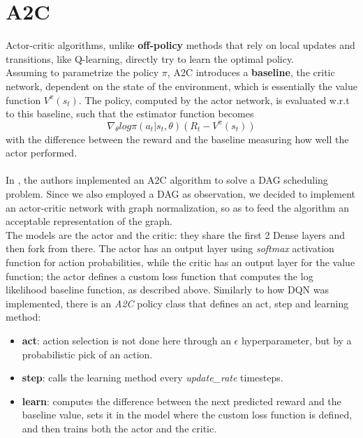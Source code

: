 \section{A2C}
Actor-critic algorithms, unlike \textbf{off-policy} methods that rely on local updates and transitions, like Q-learning, directly try to learn the optimal policy.\\
Assuming to parametrize the policy $\pi$, A2C introduces a \textbf{baseline}, the critic network, dependent on the state of the environment, which is essentially the value function \textbf{$V^{\pi}(s_t)$}. The policy, computed by the actor network, is evaluated w.r.t to this baseline, such that the estimator function becomes $$\nabla_{\theta} log \pi(a_t | s_t,\theta) (R_t - V^{\pi}(s_t))$$ with the difference between the reward and the baseline measuring how well the actor performed. \\ \\
In \cite{a2c}, the authors implemented an A2C algorithm to solve a DAG scheduling problem. Since we also employed a DAG as observation, we decided to implement an actor-critic network with graph normalization, so as to feed the algorithm an acceptable representation of the graph. \\ 
The models are the actor and the critic: they share the first 2 Dense layers and then fork from there. The actor has an output layer using \textit{softmax} activation function for action probabilities, while the critic has an output layer for the value function; the actor defines a custom loss function that computes the log likelihood baseline function, as described above. Similarly to how DQN was implemented, there is an \textit{A2C} policy class that defines an act, step and learning method:
\begin{itemize}
\item \textbf{act}: action selection is not done here through an $\epsilon$ hyperparameter, but by a probabilistic pick of an action.
\item \textbf{step}: calls the learning method every \textit{update\_rate} timesteps.
\item \textbf{learn}: computes the difference between the next predicted reward and the baseline value, sets it in the model where the custom loss function is defined, and then trains both the actor and the critic.
\end{itemize}

 